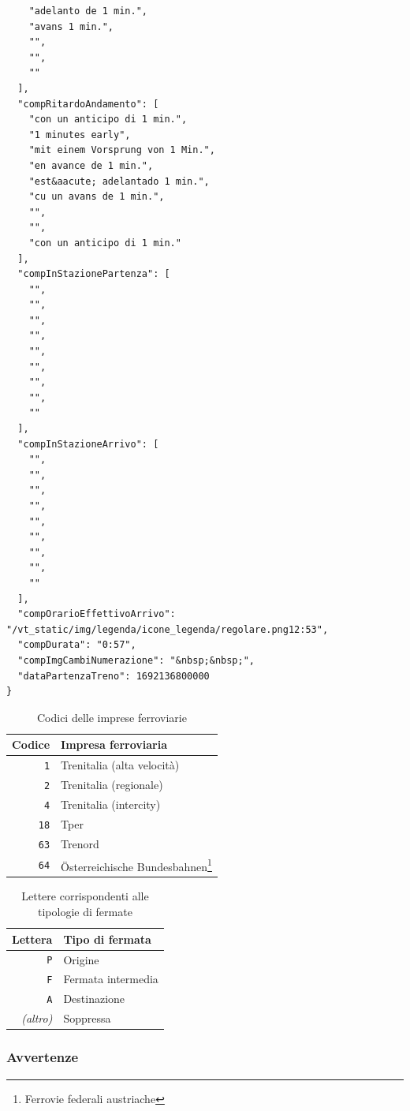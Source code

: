 \documentclass[12pt,italian]{report}
\begin{document}
\begin{verbatim}
    "adelanto de 1 min.",
    "avans 1 min.",
    "",
    "",
    ""
  ],
  "compRitardoAndamento": [
    "con un anticipo di 1 min.",
    "1 minutes early",
    "mit einem Vorsprung von 1 Min.",
    "en avance de 1 min.",
    "est&aacute; adelantado 1 min.",
    "cu un avans de 1 min.",
    "",
    "",
    "con un anticipo di 1 min."
  ],
  "compInStazionePartenza": [
    "",
    "",
    "",
    "",
    "",
    "",
    "",
    "",
    ""
  ],
  "compInStazioneArrivo": [
    "",
    "",
    "",
    "",
    "",
    "",
    "",
    "",
    ""
  ],
  "compOrarioEffettivoArrivo": "/vt_static/img/legenda/icone_legenda/regolare.png12:53",
  "compDurata": "0:57",
  "compImgCambiNumerazione": "&nbsp;&nbsp;",
  "dataPartenzaTreno": 1692136800000
}
\end{verbatim}

\begin{table}[h] \centering
    \begin{tabular}{r|l}
      Codice & Impresa ferroviaria \\
      \hline
      \texttt{1} & Trenitalia (alta velocità) \\
      \texttt{2} & Trenitalia (regionale) \\
      \texttt{4} & Trenitalia (intercity) \\
      \texttt{18} & Tper \\
      \texttt{63} & Trenord \\
      \texttt{64} & Österreichische Bundesbahnen\footnote{Ferrovie
                    federali austriache}
    \end{tabular}
    \caption{Codici delle imprese ferroviarie}
    \label{codice_cliente}
\end{table}

\begin{table}[h] \centering
    \begin{tabular}{r|l}
      Lettera & Tipo di fermata \\
      \hline
      \texttt{P} & Origine \\
      \texttt{F} & Fermata intermedia \\
      \texttt{A} & Destinazione \\
      \textit{(altro)} & Soppressa
    \end{tabular}
    \caption{Lettere corrispondenti alle tipologie di fermate}
    \label{tipo_fermata}
\end{table}

\subsubsection{Avvertenze}
\end{document}
